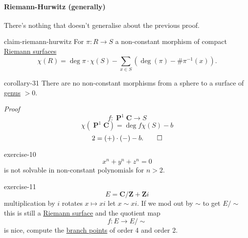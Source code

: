 \documentclass[10pt,]{book}
\makeatletter
\renewcommand*{\proofname}{Proof}
\renewenvironment{proof}[1][\proofname]{\par
  \pushQED{\qed}%
  \normalfont \topsep6\p@\@plus6\p@\relax
  \trivlist
  \item\relax
    {\itshape
    #1\@addpunct{.}}\hspace\labelsep\ignorespaces
}{%
  \popQED\endtrivlist\@endpefalse
}
\numberwithin{equation}{section}
\newcommand{\inv}{^{-1}}
\newcommand{\ZZ}{\mathbf{Z}}
\newcommand{\CC}{\mathbf{C}}
\DeclareMathOperator{\PP}{\mathbf{P}}
\newcommand{\gt}{>}
\makeatother
\begin{document}
\paragraph[{Riemann-Hurwitz (generally)}]{Riemann-Hurwitz (generally)}\hypertarget{paragraphs-8}{}
\hypertarget{p-531}{}%
There's nothing that doesn't generalise about the previous proof.%
\begin{claim}{}{}{claim-riemann-hurwitz}%
\hypertarget{p-532}{}%
For \(\pi\colon R\to S\) a non-constant morphism of compact \hyperref[def-top-riem-surface]{Riemann surfaces}%
\begin{equation*}
\chi(R) = \deg \pi \cdot \chi(S)  - \sum_{x\in S} (\deg(\pi) - \#\pi\inv(x))\text{.}
\end{equation*}
%
\end{claim}
\begin{corollary}{}{}{corollary-31}%
\hypertarget{p-533}{}%
There are no non-constant morphisms from a sphere to a surface of \hyperref[fact-existance-genus]{genus} \(\gt 0\).%
\end{corollary}
\begin{proof}\hypertarget{proof-85}{}
\hypertarget{p-534}{}%
%
\begin{equation*}
f\colon \PP^1 \CC \to S
\end{equation*}
%
\begin{equation*}
\chi(\PP^1 \CC) = \deg f \chi(S) - b
\end{equation*}
%
\begin{equation*}
2 = (+)\cdot (-) - b\text{.}\qedhere
\end{equation*}
%
\end{proof}
\begin{inlineexercise}{}{exercise-10}%
\hypertarget{p-535}{}%
%
\begin{equation*}
x^n  +y^ n + z^n = 0
\end{equation*}
is not solvable in non-constant polynomials for \(n \gt 2\).%
\end{inlineexercise}
\begin{inlineexercise}{}{exercise-11}%
\hypertarget{p-536}{}%
%
\begin{equation*}
E = \CC/ \ZZ + \ZZ i
\end{equation*}
multiplication by \(i\) rotates \(x \mapsto xi\) let \(x \sim xi\). If we mod out by \(\sim\) to get \(E/\sim\) this is still a \hyperref[def-top-riem-surface]{Riemann surface} and the quotient map%
\begin{equation*}
f \colon E \to E / \sim
\end{equation*}
is nice, compute the \hyperref[def-branch-point]{branch points}  of order 4 and order 2.%
\end{inlineexercise}
\end{document}
